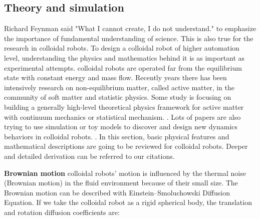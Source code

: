 \subsection{Theory and simulation}
Richard Feynman said "What I cannot create, I do not understand." to emphasize the importance of fundamental understanding of science. This is also true for the  research in colloidal robots. To design a colloidal robot of higher automation level, understanding the physics and mathematics behind it is as  important as  experimental attempts. colloidal robots are operated far from the equilibrium state with constant energy and mass flow. Recently years there has been intensively research on non-equilibrium matter, called active matter, in the community of soft matter and statistic physics. Some study is focusing on building a generally high-level theoretical physics framework for active matter with continuum mechanics or statistical mechanism. \autocite{stenhammar2013continuum,solon2015pressure,fodor2016far}. Lots of papers are also trying to use simulation or toy models to discover and design new dynamics behaviors in colloidal robots. \autocite{bechinger2016active,speck2014effective,ten2011brownian}. In this section,  basic physical features and mathematical descriptions are going to be reviewed for colloidal robots.  Deeper and detailed derivation can be referred to our citations.

\textbf{Brownian motion} colloidal robots' motion is influenced by the thermal noise (Brownian motion) in the fluid environment because of their small size. The Brownian motion can be described with Einstein–Smoluchowski Diffusion Equation\autocite{islam2004einstein}. If we take the colloidal robot as  a rigid spherical body, the translation and rotation diffusion coefficients are: 

